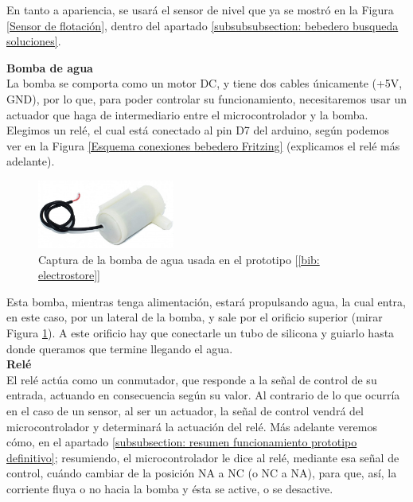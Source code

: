 \documentclass[12pt]{article}
\begin{document}
	\noindent En tanto a apariencia, se usará el sensor de nivel que ya se mostró en la Figura \ref{Sensor de flotación}, dentro del apartado \ref{subsubsubsection: bebedero busqueda soluciones}.

	\pagebreak
	
	\noindent \textbf{Bomba de agua} \\
	
	\noindent La bomba se comporta como un motor DC, y tiene dos cables únicamente (+5V, GND), por lo que, para poder controlar su funcionamiento, necesitaremos usar un actuador que haga de intermediario entre el microcontrolador y la bomba. Elegimos un relé, el cual está conectado al pin D7 del arduino, según podemos ver en la Figura \ref{Esquema conexiones bebedero Fritzing} (explicamos el relé más adelante). \\
	
	\begin{figure}[h]
		\begin{center}
			\includegraphics[width=0.4\textwidth]{img/bomba_agua.jpg}
			\caption{Captura de la bomba de agua usada en el prototipo [\ref{bib: electrostore}]}
			\label{Captura bomba agua}
		\end{center}
	\end{figure}
	
	\noindent Esta bomba, mientras tenga alimentación, estará propulsando agua, la cual entra, en este caso, por un lateral de la bomba, y sale por el orificio superior (mirar Figura \ref{Captura bomba agua}). A este orificio hay que conectarle un tubo de silicona y guiarlo hasta donde queramos que termine llegando el agua. \\
	
	\noindent \textbf{Relé}\\
	
	\noindent El relé actúa como un conmutador, que responde a la señal de control de su entrada, actuando en consecuencia según su valor. Al contrario de lo que ocurría en el caso de un sensor, al ser un actuador, la señal de control vendrá del microcontrolador y determinará la actuación del relé. Más adelante veremos cómo, en el apartado \ref{subsubsection: resumen funcionamiento prototipo definitivo}; resumiendo, el microcontrolador le dice al relé, mediante esa señal de control, cuándo cambiar de la posición NA a NC (o NC a NA), para que, así, la corriente fluya o no hacia la bomba y ésta se active, o se desactive. \\
	
\end{document}
